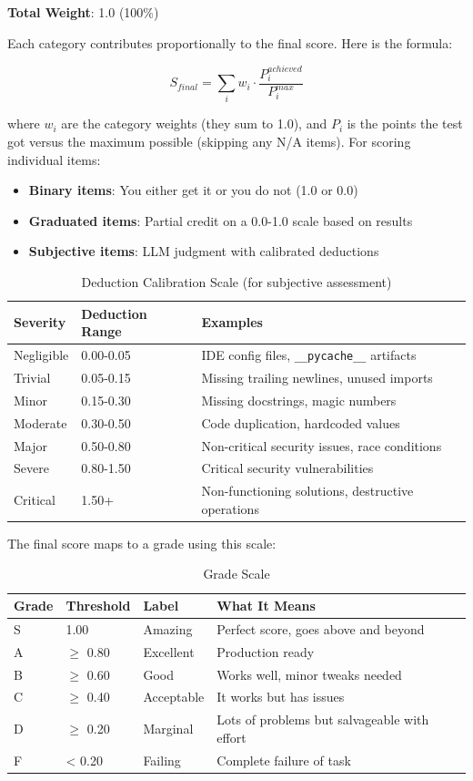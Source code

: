 \documentclass[11pt]{article}
\begin{document}
\textbf{Total Weight}: 1.0 (100\%)

Each category contributes proportionally to the final score. Here is the formula:

$$S_{final} = \sum_{i} w_i \cdot \frac{P_i^{achieved}}{P_i^{max}}$$

where $w_i$ are the category weights (they sum to 1.0), and $P_i$ is the points
the test got versus the maximum possible (skipping any N/A items). For scoring
individual items:

\begin{itemize}
\item \textbf{Binary items}: You either get it or you do not (1.0 or 0.0)
\item \textbf{Graduated items}: Partial credit on a 0.0-1.0 scale based on results
\item \textbf{Subjective items}: LLM judgment with calibrated deductions

\end{itemize}

\begin{table}[htbp]
\centering
\caption{Deduction Calibration Scale (for subjective assessment)}
\begin{tabular}{lll}
\toprule
Severity & Deduction Range & Examples \\
\midrule
Negligible & 0.00-0.05 & IDE config files, \texttt{\_\_pycache\_\_} artifacts \\
Trivial & 0.05-0.15 & Missing trailing newlines, unused imports \\
Minor & 0.15-0.30 & Missing docstrings, magic numbers \\
Moderate & 0.30-0.50 & Code duplication, hardcoded values \\
Major & 0.50-0.80 & Non-critical security issues, race conditions \\
Severe & 0.80-1.50 & Critical security vulnerabilities \\
Critical & 1.50+ & Non-functioning solutions, destructive operations \\
\bottomrule
\end{tabular}
\end{table}


The final score maps to a grade using this scale:

\begin{table}[htbp]
\centering
\caption{Grade Scale}
\begin{tabular}{llll}
\toprule
Grade & Threshold & Label & What It Means \\
\midrule
S & 1.00 & Amazing & Perfect score, goes above and beyond \\
A & $\geq$ 0.80 & Excellent & Production ready \\
B & $\geq$ 0.60 & Good & Works well, minor tweaks needed \\
C & $\geq$ 0.40 & Acceptable & It works but has issues \\
D & $\geq$ 0.20 & Marginal & Lots of problems but salvageable with effort \\
F & < 0.20 & Failing & Complete failure of task \\
\bottomrule
\end{tabular}
\end{table}
\end{document}
